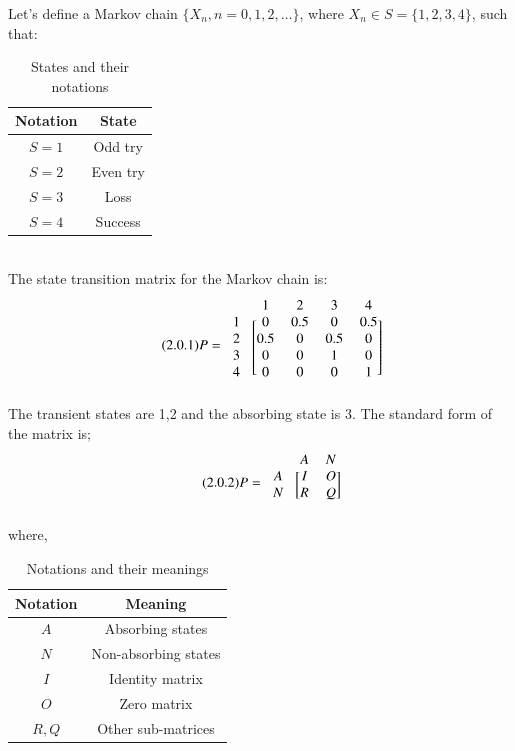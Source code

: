 \documentclass[journal,12pt,twocolumn]{IEEEtran}
\begin{document}
 Let's define a Markov chain $\{X_{n},n=0,1,2,\dots\}$, where $X_{n}\in S=\{1,2,3,4\}$, such that:
\begin{table}[h!]
\centering
\caption{States and their notations}
\label{table:1}
\begin{tabular}{|c|c|}
    \hline
    Notation & State \\
    \hline
    $S=1$ & Odd try\\[1ex]
    \hline
    $S=2$ & Even try\\[1ex]
    \hline
    $S=3$ & Loss\\[1ex]
    \hline
    $S=4$ & Success\\[1ex]
    \hline
\end{tabular}
\end{table}
\\The state transition matrix for the Markov chain is:
\begin{align}
\tag{2.0.1}
\label{eq:2.0.1}
    P=\begin{blockarray}{ccccc}
    &1 &2 &3 &4\\
    \begin{block}{c[cccc]}
1 & 0 & 0.5 & 0 & 0.5\\
2 & 0.5 & 0 & 0.5 & 0\\
3 & 0 & 0 & 1 & 0\\
4 & 0 & 0 & 0 & 1\\
\end{block}
\end{blockarray}
\end{align}
The transient states are 1,2 and the absorbing state is 3. The standard form of the matrix is;
\begin{align}
\tag{2.0.2}
\label{eq:2.0.2}
    P=\begin{blockarray}{ccc}
&A & N \\
\begin{block}{c[cc]}
  A & I & O  \\
  N & R & Q \\
\end{block}
\end{blockarray}
\end{align}
where,
\begin{table}[h!]
\centering
\caption{Notations and their meanings}
\label{table:2}
\begin{tabular}{|c|c|}
    \hline
    Notation & Meaning \\
    \hline
    $A$ & Absorbing states\\[1ex]
    \hline
    $N$ & Non-absorbing states\\[1ex]
    \hline
    $I$ & Identity matrix\\[1ex]
    \hline
    $O$ & Zero matrix\\[1ex]
    \hline
    $R,Q$ & Other sub-matrices\\[1ex]
    \hline
\end{tabular}
\end{table}
\end{document}
